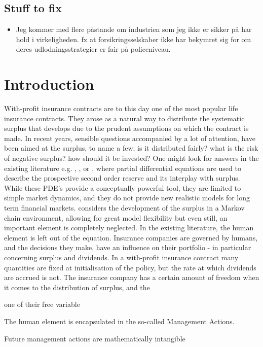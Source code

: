 \documentclass[12pt]{article}
\begin{document}
\subsection*{Stuff to fix}
\begin{itemize}
\item Jeg kommer med flere påstande om industrien som jeg ikke er sikker på har hold i virkeligheden. fx at forsikringsselskaber ikke har bekymret sig for om deres udlodningsstrategier er fair på policeniveau.
\end{itemize}
\section*{Introduction}

With-profit insurance contracts are to this day one of the most popular life insurance contracts. They arose as a natural way to distribute the systematic surplus that develops due to the prudent assumptions on which the contract is made. In recent years, sensible questions accompanied by a lot of attention, have been aimed at the surplus, to name a few; is it distributed fairly? what is the risk of negative surplus? how should it be invested? One might look for answers in the existing literature e.g. \citet{Liv2}, \citet{NorbergB}, \citet{Steffensen0} or \citet{Steffensen1}, where partial differential equations are used to describe the prospective second order reserve and its interplay with surplus. While these PDE's provide a conceptually powerful tool, they are limited to simple market dynamics, and they do not provide new realistic models for long term financial markets. \citet{NorbergB} considers the development of the surplus in a Markov chain environment, allowing for great model flexibility but even still, an important element is completely neglected. In the existing literature, the human element is left out of the equation. Insurance companies are governed by humans, and the decisions they make, have an influence on their portfolio - in particular concerning surplus and dividends. In a with-profit insurance contract many quantities are fixed at initialisation of the policy, but the rate at which dividends are accrued is not. The insurance company has a certain amount of freedom when it comes to the distribution of surplus, and the 


one of their free variable

 The human element is encapsulated in the so-called Management Actions. 


Future management actions are mathematically intangible 
\end{document}
